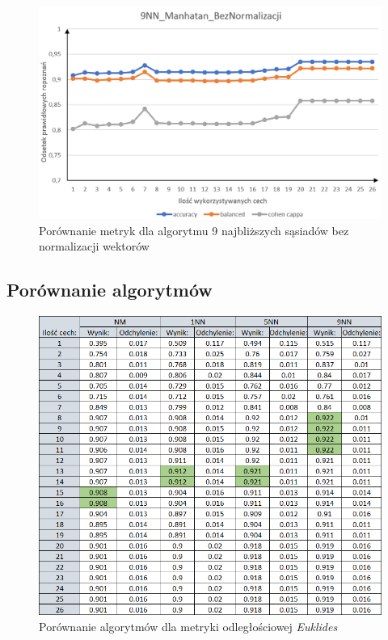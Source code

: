 \documentclass[12pt]{article}
\begin{document}
\begin{figure}[H]
	\centering
		\includegraphics[scale=0.66]{images/metrics/9nn_manhatan_beznorm.png}
	\caption{Porównanie metryk dla algorytmu 9 najbliższych sąsiadów bez normalizacji wektorów}
\end{figure}
\subsection{Porównanie algorytmów}

\begin{figure}[H]
	\centering
		\includegraphics[scale=0.8]{images/algorithms/euklides_norm_tab.png}
	\caption{Porównanie algorytmów dla metryki odległościowej \textit{Euklides}}
\end{figure}
\end{document}
